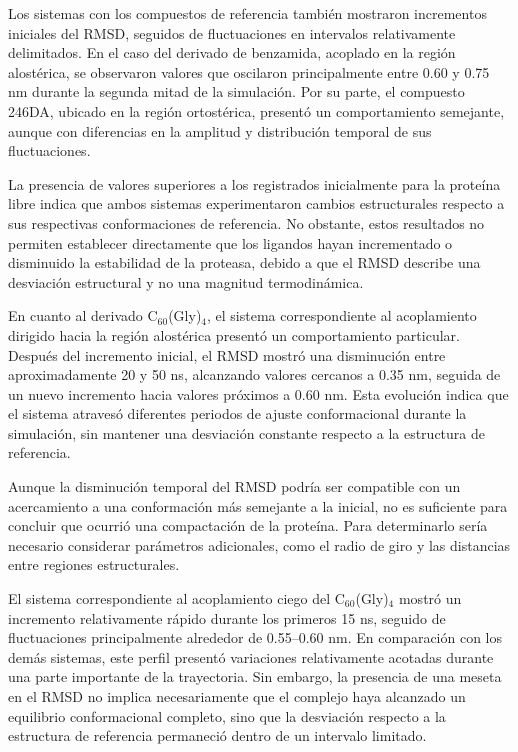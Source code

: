 Los sistemas con los compuestos de referencia también mostraron incrementos iniciales del RMSD, seguidos de fluctuaciones en intervalos relativamente delimitados. En el caso del derivado de benzamida, acoplado en la región alostérica, se observaron valores que oscilaron principalmente entre 0.60 y 0.75 nm durante la segunda mitad de la simulación. Por su parte, el compuesto 246DA, ubicado en la región ortostérica, presentó un comportamiento semejante, aunque con diferencias en la amplitud y distribución temporal de sus fluctuaciones.

La presencia de valores superiores a los registrados inicialmente para la proteína libre indica que ambos sistemas experimentaron cambios estructurales respecto a sus respectivas conformaciones de referencia. No obstante, estos resultados no permiten establecer directamente que los ligandos hayan incrementado o disminuido la estabilidad de la proteasa, debido a que el RMSD describe una desviación estructural y no una magnitud termodinámica.

En cuanto al derivado C$_{60}$(Gly)$_4$, el sistema correspondiente al acoplamiento dirigido hacia la región alostérica presentó un comportamiento particular. Después del incremento inicial, el RMSD mostró una disminución entre aproximadamente 20 y 50 ns, alcanzando valores cercanos a 0.35 nm, seguida de un nuevo incremento hacia valores próximos a 0.60 nm. Esta evolución indica que el sistema atravesó diferentes periodos de ajuste conformacional durante la simulación, sin mantener una desviación constante respecto a la estructura de referencia.

Aunque la disminución temporal del RMSD podría ser compatible con un acercamiento a una conformación más semejante a la inicial, no es suficiente para concluir que ocurrió una compactación de la proteína. Para determinarlo sería necesario considerar parámetros adicionales, como el radio de giro y las distancias entre regiones estructurales.

El sistema correspondiente al acoplamiento ciego del C$_{60}$(Gly)$_4$ mostró un incremento relativamente rápido durante los primeros 15 ns, seguido de fluctuaciones principalmente alrededor de 0.55--0.60 nm. En comparación con los demás sistemas, este perfil presentó variaciones relativamente acotadas durante una parte importante de la trayectoria. Sin embargo, la presencia de una meseta en el RMSD no implica necesariamente que el complejo haya alcanzado un equilibrio conformacional completo, sino que la desviación respecto a la estructura de referencia permaneció dentro de un intervalo limitado.

